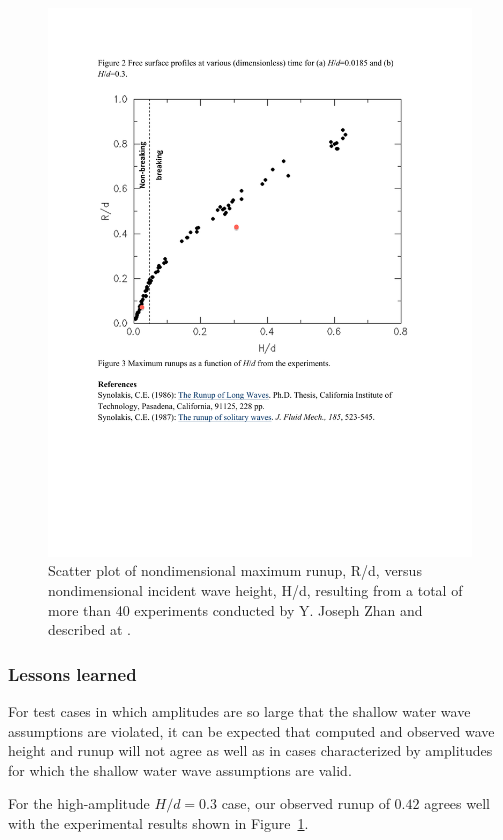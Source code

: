 \begin{figure}[ht]
\hfil\includegraphics[width=5.0in]{bp4/bp4maxrscatter.pdf}\hfil
\caption{\label{bp4maxrscatter} 
Scatter plot of nondimensional maximum runup, R/d, versus nondimensional incident wave height, H/d, resulting from a total of more than 40 experiments conducted by Y. Joseph Zhan and described at \cite{bp-description}.\\
}
\end{figure}

\subsubsection{Lessons learned}

For test cases in which amplitudes are so large that the shallow water wave assumptions are violated, it can be expected that computed and observed wave height and runup will not agree as well as in cases characterized by amplitudes for which the shallow water wave assumptions are valid.

For the high-amplitude $H/d = 0.3$ case, our observed runup of $0.42$
agrees well with the experimental results shown in
Figure~\ref{bp4maxrscatter}.

